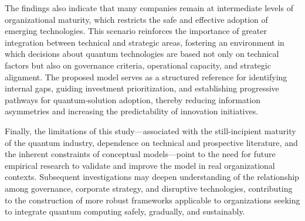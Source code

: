 \documentclass{icis}
\begin{document}
The findings also indicate that many companies remain at intermediate levels of organizational maturity, which restricts the safe and effective adoption of emerging technologies. This scenario reinforces the importance of greater integration between technical and strategic areas, fostering an environment in which decisions about quantum technologies are based not only on technical factors but also on governance criteria, operational capacity, and strategic alignment. The proposed model serves as a structured reference for identifying internal gaps, guiding investment prioritization, and establishing progressive pathways for quantum-solution adoption, thereby reducing information asymmetries and increasing the predictability of innovation initiatives.

Finally, the limitations of this study---associated with the still-incipient maturity of the quantum industry, dependence on technical and prospective literature, and the inherent constraints of conceptual models---point to the need for future empirical research to validate and improve the model in real organizational contexts. Subsequent investigations may deepen understanding of the relationship among governance, corporate strategy, and disruptive technologies, contributing to the construction of more robust frameworks applicable to organizations seeking to integrate quantum computing safely, gradually, and sustainably.

\printbibliography
\end{document}
